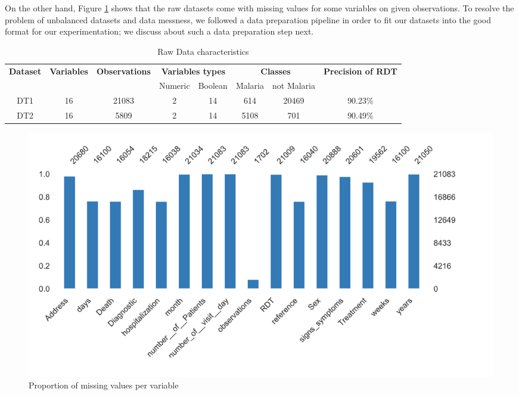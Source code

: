 On the other hand,  Figure \ref{missing_values} shows that the raw datasets come with missing values for  some variables on given observations.
To resolve the problem of unbalanced datasets and data messness, we followed a data preparation pipeline in order to fit our datasets into the good format for our experimentation; we discuss about such a data preparation step next. 

\begin{table}[!ht]
\centering
  \begin{tabular}{cccccccc}
    \toprule
    \multirow{2}{*}{\textbf{Dataset}} &
      \textbf{Variables}&\textbf{Observations}&
      \multicolumn{2}{c}{\textbf{Variables types}}& \multicolumn{2}{c}{\textbf{Classes}} & \textbf{Precision of RDT}\\
    & & & Numeric & Boolean & Malaria & not Malaria \\
    \midrule
    DT1 &16 & 21083  & 2 &  14& 614&20469 & 90.23\% \\
    DT2 & 16 & 5809 & 2 & 14 & 5108&701 & 90.49\% \\
    \bottomrule
  \end{tabular}
  \caption{Raw Data characteristics}\label{raw_data}
\end{table}
%
\begin{figure}[!ht]
    \centering
    \includegraphics[width=.8\linewidth]{missing_values}
    \caption{Proportion of missing values per variable}
    \label{missing_values}
\end{figure}

